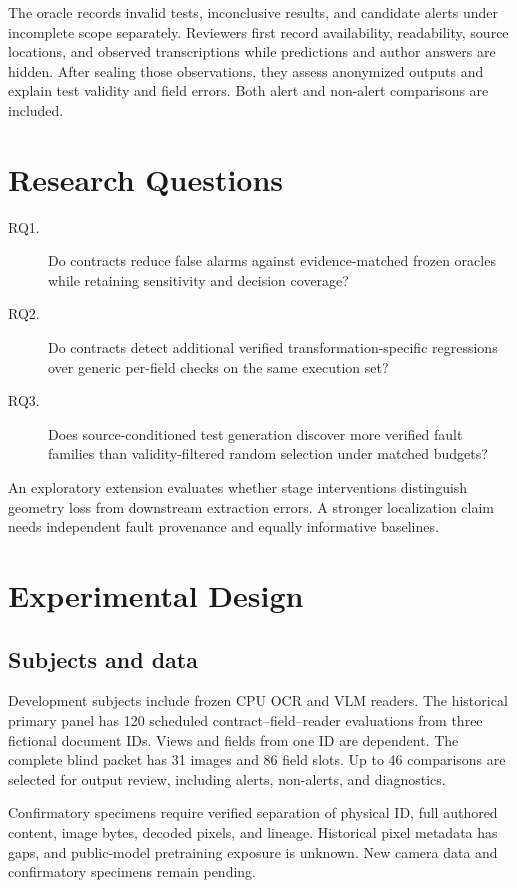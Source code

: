 \documentclass[sigconf,review,anonymous]{acmart}
\begin{document}
The oracle records invalid tests, inconclusive results, and candidate alerts under incomplete scope separately. Reviewers first record availability, readability, source locations, and observed transcriptions while predictions and author answers are hidden. After sealing those observations, they assess anonymized outputs and explain test validity and field errors. Both alert and non-alert comparisons are included.

\section{Research Questions}
\begin{description}
\item[RQ1.] Do contracts reduce false alarms against evidence-matched frozen oracles while retaining sensitivity and decision coverage?
\item[RQ2.] Do contracts detect additional verified transformation-specific regressions over generic per-field checks on the same execution set?
\item[RQ3.] Does source-conditioned test generation discover more verified fault families than validity-filtered random selection under matched budgets?
\end{description}

An exploratory extension evaluates whether stage interventions distinguish geometry loss from downstream extraction errors. A stronger localization claim needs independent fault provenance and equally informative baselines.

\section{Experimental Design}
\subsection{Subjects and data}
Development subjects include frozen CPU OCR and VLM readers. The historical primary panel has 120 scheduled contract--field--reader evaluations from three fictional document IDs. Views and fields from one ID are dependent. The complete blind packet has 31 images and 86 field slots. Up to 46 comparisons are selected for output review, including alerts, non-alerts, and diagnostics.

Confirmatory specimens require verified separation of physical ID, full authored content, image bytes, decoded pixels, and lineage. Historical pixel metadata has gaps, and public-model pretraining exposure is unknown. New camera data and confirmatory specimens remain pending.
\end{document}
